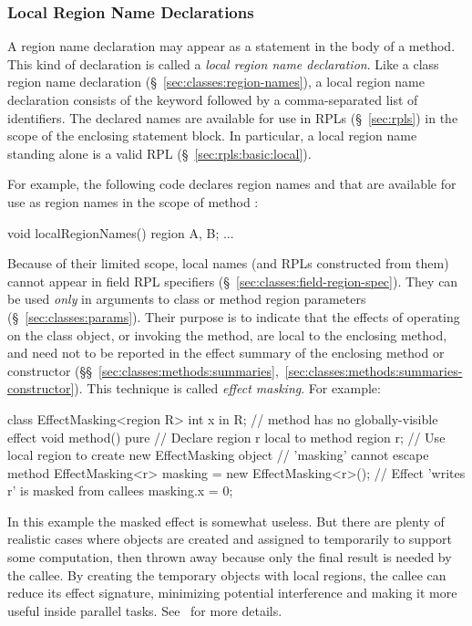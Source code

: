 \subsubsection{Local Region Name Declarations%
\label{sec:classes:methods:local-regions}}

A region name declaration may appear as a statement in the body of a
method.  This kind of declaration is called a \emph{local region name
  declaration}.  Like a class region name declaration
(\S~\ref{sec:classes:region-names}), a local region name declaration
consists of the keyword  followed by a comma-separated
list of identifiers.  The declared names are available for use in RPLs
(\S~\ref{sec:rpls}) in the scope of the enclosing statement block.  In
particular, a local region name standing alone is a valid RPL
(\S~\ref{sec:rpls:basic:local}).

For example, the following code declares
region names  and  that are available for use as region
names in the scope of method :
%
\begin{dpjlisting}
void localRegionNames() {
	region A, B;
	...
}
\end{dpjlisting}
%

Because of their limited scope, local names (and RPLs constructed from
them) cannot appear in field RPL specifiers
(\S~\ref{sec:classes:field-region-spec}).  They can be used
\emph{only} in arguments to class or method region parameters
(\S~\ref{sec:classes:params}).  Their purpose is to indicate that the
effects of operating on the class object, or invoking the method, are
local to the enclosing method, and need not to be reported in the
effect summary of the enclosing method or constructor
(\S\S~\ref{sec:classes:methods:summaries},~\ref{sec:classes:methods:summaries-constructor}).
This technique is called \emph{effect masking}.  For example:
%
\begin{dpjlisting}
class EffectMasking<region R> {
  int x in R;
  // method has no globally-visible effect
  void method() pure {
    // Declare region r local to method
    region r;
    // Use local region to create new EffectMasking object
    // 'masking' cannot escape method
    EffectMasking<r> masking = new EffectMasking<r>();
    // Effect 'writes r' is masked from callees
    masking.x = 0;
  }
}
\end{dpjlisting}
%
In this example the masked effect is somewhat useless.  But there are
plenty of realistic cases where objects are created and assigned to
temporarily to support some computation, then thrown away because only
the final result is needed by the callee.  By creating the temporary
objects with local regions, the callee can reduce its effect
signature, minimizing potential interference and making it more useful
inside parallel tasks.  See \tutorial\ for more details.

